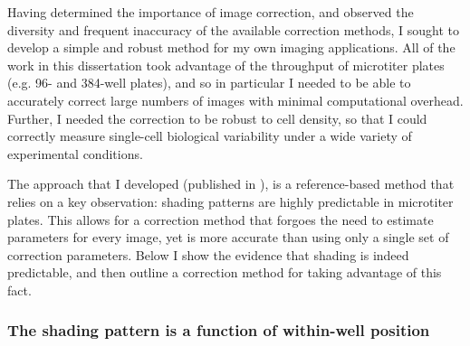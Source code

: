 Having determined the importance of image correction, and observed
the diversity and frequent inaccuracy of the available correction methods,
I sought to develop a simple and robust method for my own imaging applications.
All of the work in this dissertation took advantage of the throughput of
microtiter plates (e.g. 96- and 384-well plates), and so in particular I needed
to be able to accurately correct large numbers of images with
minimal computational overhead.
Further, I needed the correction to be robust to cell density,
so that I could correctly measure single-cell biological variability
under a wide variety of experimental conditions.


The approach that I developed (published in \cite{Coster2014}),
is a reference-based
method that relies on a key observation: shading patterns
are highly predictable
in microtiter plates. This allows for a correction method
that forgoes the need to
estimate parameters for every image, yet is more accurate
than using only
a single set of correction parameters. Below I show the
evidence that shading is indeed predictable, and then outline
a correction method for taking advantage of this fact.


\subsubsection{The shading pattern is a function of within-well position}



